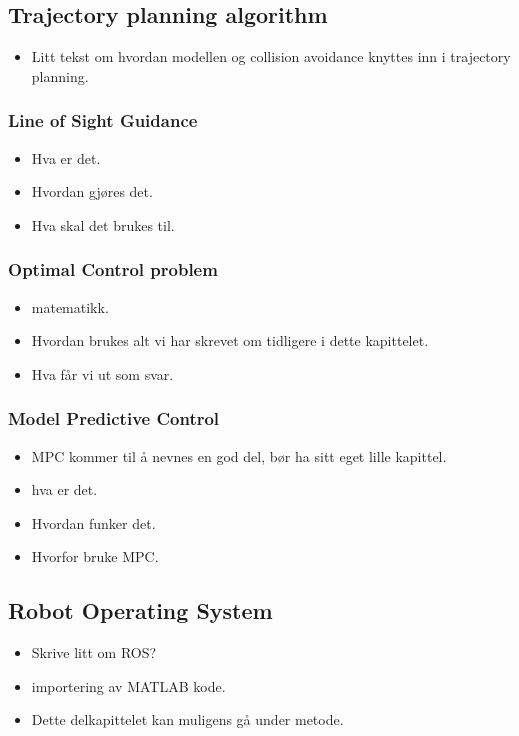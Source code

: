 \subsection{Trajectory planning algorithm}
\begin{itemize}
    \item Litt tekst om hvordan modellen og collision avoidance knyttes inn i trajectory planning.
\end{itemize}

\subsubsection{Line of Sight Guidance}
\begin{itemize}
    \item Hva er det.
    \item Hvordan gjøres det.
    \item Hva skal det brukes til.
\end{itemize}

\subsubsection{Optimal Control problem}
\begin{itemize}
    \item matematikk.
    \item Hvordan brukes alt vi har skrevet om tidligere i dette kapittelet.
    \item Hva får vi ut som svar.
\end{itemize}

\subsubsection{Model Predictive Control}
\begin{itemize}
    \item MPC kommer til å nevnes en god del, bør ha sitt eget lille kapittel.
    \item hva er det.
    \item Hvordan funker det.
    \item Hvorfor bruke MPC.
\end{itemize}

\subsection{Robot Operating System}
\begin{itemize}
    \item Skrive litt om ROS?
    \item importering av MATLAB kode.
    \item Dette delkapittelet kan muligens gå under metode.
\end{itemize}

\newpage